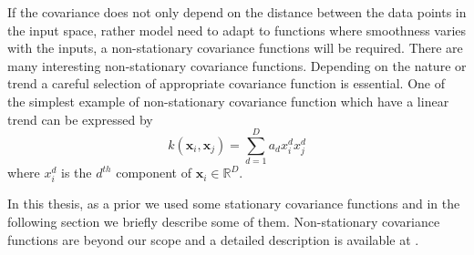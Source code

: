If the covariance does not only depend on the distance between the data points in the input space, rather model need to adapt to functions where smoothness varies with the inputs, a non-stationary covariance functions will be required. There are many interesting non-stationary covariance functions. Depending on the nature or trend a careful selection of appropriate covariance function is essential. One of the simplest example of non-stationary covariance function which have a linear trend can be expressed by 
\begin{equation} \label{eq:cov_nonStationary}
k\left( \textbf{x}_i, \textbf{x}_j \right) = \sum_{d=1}^{D} a_d x_i^d x_j^d
\end{equation}
where $x_i^d$ is the $d^{th}$ component of $\textbf{x}_i \in \mathbb{R}^D$. 

In this thesis, as a prior we used some stationary covariance functions and in the following section we briefly describe some of them. Non-stationary covariance functions are beyond our scope and a detailed description is available at \cite{Rasmussen_and_Williams:2006}.

